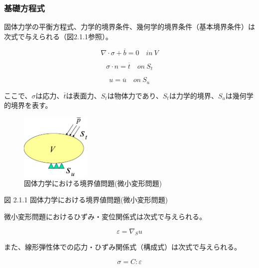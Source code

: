 \documentclass[a4paper,pandoc,ja=standard]{bxjsarticle}
\begin{document}
\hypertarget{ux57faux790eux65b9ux7a0bux5f0f}{%
\subsubsection{基礎方程式}\label{ux57faux790eux65b9ux7a0bux5f0f}}

固体力学の平衡方程式、力学的境界条件、幾何学的境界条件（基本境界条件）は次式で与えられる（図2.1.1参照）。

\begin{equation}
\nabla \cdot \sigma + \overline{b} = 0 \quad in \ V
\label{eq:2.1.1}
\end{equation}

\begin{equation}
\sigma \cdot n = \overline{t} \quad on \ S_t
\label{eq:2.1.2}
\end{equation}

\begin{equation}
u = \overline{u} \quad on \ S_u
\label{eq:2.1.3}
\end{equation}

ここで、\(\sigma\)は応力、\(\overline{t}\)は表面力、\(S_t\)は物体力であり、\(S_t\)は力学的境界、\(S_u\)は幾何学的境界を表す。

\begin{figure}
\centering
\includegraphics[width=0.3\textwidth,height=\textheight]{media/theory01_01.png}
\caption{固体力学における境界値問題(微小変形問題)}
\end{figure}

図 2.1.1 固体力学における境界値問題(微小変形問題)

微小変形問題におけるひずみ・変位関係式は次式で与えられる。

\begin{equation}
\varepsilon = \nabla_S u
\label{eq:2.1.4}
\end{equation}

また、線形弾性体での応力・ひずみ関係式（構成式）は次式で与えられる。

\begin{equation}
\sigma = C : \varepsilon
\label{eq:2.1.5}
\end{equation}
\end{document}
